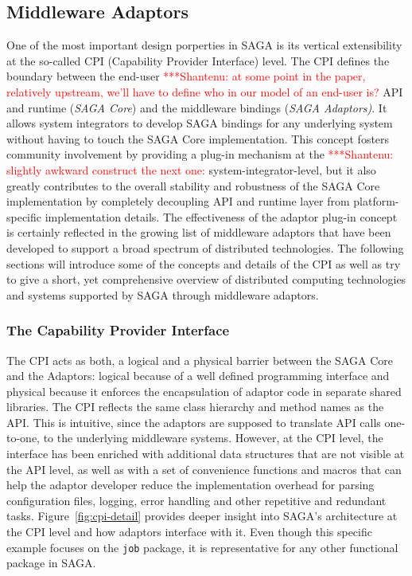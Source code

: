 \documentclass[a4paper,10pt]{article}
\newcommand{\jhanote}[1]{  {\textcolor{red}     { ***Shantenu: #1 }}}
\newcommand{\jhanote}[1]{}
\begin{document}
 \subsection{Middleware Adaptors}

 One of the most important design porperties in SAGA is its vertical
 extensibility at the so-called CPI (Capability Provider Interface)
 level.  The CPI defines the boundary between the end-user \jhanote{at
   some point in the paper, relatively upstream, we'll have to define
   who in our model of an end-user is?} API and runtime (\textit{SAGA
   Core}) and the middleware bindings (\textit{SAGA Adaptors)}.  It
 allows system integrators to develop SAGA bindings for any underlying
 system without having to touch the SAGA Core implementation.  This
 concept fosters community involvement by providing a plug-in
 mechanism at the \jhanote{slightly awkward construct the next one:}
 system-integrator-level, but it also greatly contributes to the
 overall stability and robustness of the SAGA Core implementation by
 completely decoupling API and runtime layer from platform-specific
 implementation details.  The effectiveness of the adaptor plug-in
 concept is certainly reflected in the growing list of middleware
 adaptors that have been developed to support a broad spectrum of
 distributed technologies. The following sections will introduce some
 of the concepts and details of the CPI as well as try to give a
 short, yet comprehensive overview of distributed computing
 technologies and systems supported by SAGA through middleware
 adaptors.
 
 \subsubsection{The Capability Provider Interface}
 
 The CPI acts as both, a logical and a physical barrier between the
 SAGA Core and the Adaptors: logical because of a well defined
 programming interface and physical because it enforces the
 encapsulation of adaptor code in separate shared libraries. The CPI
 reflects the same class hierarchy and method names as the API. This
 is intuitive, since the adaptors are supposed to translate API calls
 one-to-one, to the underlying middleware systems.  However, at the
 CPI level, the interface has been enriched with additional data
 structures that are not visible at the API level, as well as with a
 set of convenience functions and macros that can help the adaptor
 developer reduce the implementation overhead for parsing
 configuration files, logging, error handling and other repetitive and
 redundant tasks.  Figure~\ref{fig:cpi-detail} provides deeper insight
 into SAGA's architecture at the CPI level and how adaptors interface
 with it. Even though this specific example focuses on the
 \texttt{job} package, it is representative for any other functional
 package in SAGA.
 
\end{document}
